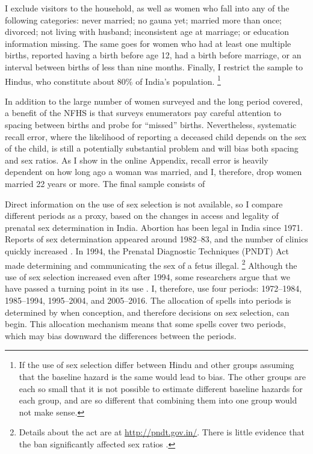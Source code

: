 \documentclass[12pt,letterpaper]{article}
\begin{document}
I exclude visitors to the household, as well as women who fall into any of the following 
categories: never married; no gauna yet; married more than once; divorced; 
not living with husband; inconsistent age at marriage; or education information missing.  
The same goes for women who had at least one multiple births, reported having a birth 
before age 12, had a birth before marriage, or an interval between births of less than 
nine months. 
Finally, I restrict the sample to Hindus, who constitute about 80\% of India’s population.%
\footnote{
If the use of sex selection differ between Hindu and other groups assuming
that the baseline hazard is the same would lead to bias. The other
groups are each so small that it is not possible to estimate different
baseline hazards for each group, and are so different that combining
them into one group would not make sense.
} 

In addition to the large number of women surveyed and the long period covered, a
benefit of the NFHS is that surveys enumerators pay careful attention to spacing between 
births and probe for ``missed'' births.
Nevertheless, systematic recall error, where the likelihood of reporting a deceased 
child depends on the sex of the child, is still a potentially substantial problem and
will bias both spacing and sex ratios.
As I show in the online Appendix, recall error is heavily dependent on how long ago a 
woman was married, and I, therefore, drop women married 22 years or more.
The final sample consists of 


Direct information on the use of sex selection is not available, so I compare different 
periods as a proxy, based on the changes in access and legality of prenatal sex 
determination in India.
Abortion has been legal in India since 1971.
Reports of sex determination appeared around 1982--83, and the number of clinics 
quickly increased \citep{Sudha1999,bhat06,Grover2006}.
In 1994, the Prenatal Diagnostic Techniques (PNDT) Act made determining and communicating 
the sex of a fetus illegal.%
\footnote{
Details about the act are at \href{http://pndt.gov.in/}{http://pndt.gov.in/}.
There is little evidence that the ban significantly affected sex ratios \citep{Das-Gupta2016}.
}
Although the use of sex selection increased even after 1994, some researchers argue that 
we have passed a turning point in its use \citep{Das_Gupta2009,Diamond-Smith2015}.
I, therefore, use four periods: 1972--1984, 1985--1994, 1995--2004, and 2005--2016.
The allocation of spells into periods is determined by when conception, and therefore 
decisions on sex selection, can begin. 
This allocation mechanism means that some spells cover two periods, which may bias 
downward the differences between the periods.
\end{document}
